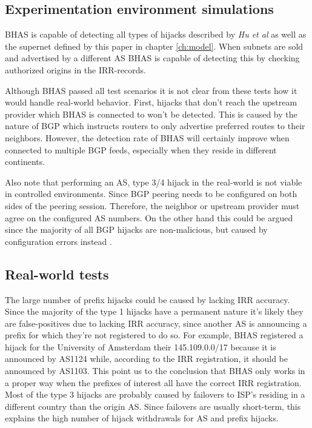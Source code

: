 \subsection{Experimentation environment simulations}\label{subsec:hijacksimulations}
BHAS is capable of detecting all types of hijacks described by \emph{Hu et al} as well as the supernet defined by this paper in chapter \ref{ch:model}. When subnets are sold and advertised by a different AS BHAS is capable of detecting this by checking authorized origins in the IRR-records.\par

Although BHAS passed all test scenarios it is not clear from these tests how it would handle real-world behavior. First, hijacks that don't reach the upstream provider which BHAS is connected to won't be detected. This is caused by the nature of BGP which instructs routers to only advertise preferred routes to their neighbors. However, the detection rate of BHAS will certainly improve when connected to multiple BGP feeds, especially when they reside in different continents.\par

Also note that performing an AS, type 3/4 hijack in the real-world is not viable in controlled environments. Since BGP peering needs to be configured on both sides of the peering session. Therefore, the neighbor or upstream provider must agree on the configured AS numbers. On the other hand this could be argued since the majority of all BGP hijacks are non-malicious, but caused by configuration errors instead \cite{vervier2015mind}.

\subsection{Real-world tests}\label{subsec:realworlddiscussion}
The large number of prefix hijacks could be caused by lacking IRR accuracy. Since the majority of the type 1 hijacks have a permanent nature it's likely they are false-positives due to lacking IRR accuracy, since another AS is announcing a prefix for which they're not registered to do so. For example, BHAS registered a hijack for the University of Amsterdam their 145.109.0.0/17 because it is announced by AS1124 while, according to the IRR registration, it should be announced by AS1103. This point us to the conclusion that BHAS only works in a proper way when the prefixes of interest all have the correct IRR registration. Most of the type 3 hijacks are probably caused by failovers to ISP's residing in a different country than the origin AS. Since failovers are usually short-term, this explains the high number of hijack withdrawals for AS and prefix hijacks. \par

